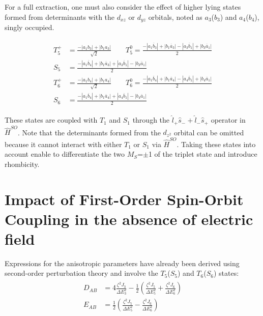 \documentclass[12pt,a4paper]{report}
\numberwithin{equation}{section}
\begin{document}
For a full extraction, one must also consider the effect of higher lying states formed from determinants with the $d_{xz}$ or $d_{yz}$ orbitals, noted as $a_3$($b_3$) and $a_4$($b_4$), singly occupied. 

\begin{align}\label{T5T6}
    \begin{split}
        T_5^+&=\frac{-|a_1b_3|+|b_1a_3|}{\sqrt{2}} \qquad T_5^0=\frac{-|a_1\overline{b}_3|+|b_1\overline{a}_3|-|a_3\overline{b}_1|+|b_3\overline{a}_1|}{2}\\
        S_5&=\frac{-|a_1\overline{b}_4|+|b_1\overline{a}_3|+|a_3\overline{b}_1|-|b_3\overline{a}_1|}{2}\\
        T_6^+&=\frac{-|a_1b_4|+|b_1a_4|}{\sqrt{2}} \qquad T_6^0=\frac{-|a_1\overline{b}_4|+|b_1\overline{a}_4|-|a_4\overline{b}_1|+|b_4\overline{a}_1|}{2}\\
        S_6&=\frac{-|a_1\overline{b}_4|+|b_1\overline{a}_4|+|a_4\overline{b}_1|-|b_4\overline{a}_1|}{2}
    \end{split}
\end{align}

These states are coupled with $T_1$ and $S_1$ through the $\hat{l}_+ \hat{s}_- + \hat{l}_-\hat{s}_+$ operator in $\hat{H}^{SO}$.
Note that the determinants formed from the $d_{z^2}$ orbital can be omitted because it cannot interact with either $T_1$ or $S_1$ via $\hat{H}^{SO}$.
Taking these states into account enable to differentiate the two $M_S$=$\pm$1 of the triplet state and introduce rhombicity.

\section{Impact of First-Order Spin-Orbit Coupling in the absence of electric field}\label{sec:NoField}

Expressions for the anisotropic parameters have already been derived using second-order perturbation theory and involve the $T_5$($S_5$) and $T_6$($S_6$) states:
\begin{align}\label{eq:PertCu2Cl5}
    \begin{split}
        D_{AB}&=4\frac{\zeta^2 J_3}{\Delta E^2_3}-\frac{1}{2}(\frac{\zeta^2 J_5}{\Delta E^2_5}+\frac{\zeta^2 J_6}{\Delta E^2_6})\\
        E_{AB}&=\frac{1}{2}(\frac{\zeta^2 J_5}{\Delta E^2_5}-\frac{\zeta^2 J_6}{\Delta E^2_6})
    \end{split}
\end{align}
\end{document}
